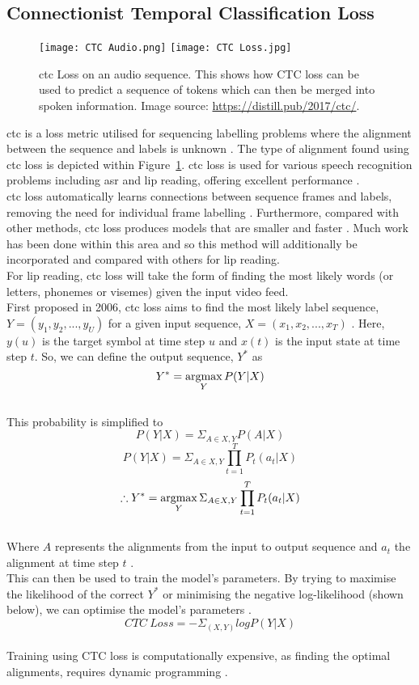\subsection{Connectionist Temporal Classification Loss}
\label{sec: CTC Loss}
\begin{figure}
\centering
\texttt{[image: CTC Audio.png]}
\texttt{[image: CTC Loss.jpg]}
\caption[\acrshort{ctc} Loss on an audio sequence.]{\acrshort{ctc} Loss on an audio sequence. This shows how CTC loss can be used to predict a sequence of tokens which can then be merged into spoken information. Image source: \url{https://distill.pub/2017/ctc/}.}
\label{fig:CTC Loss}
\end{figure}
\acrfull{ctc} \cite{original_CTC} is a loss metric utilised for sequencing labelling problems where the alignment between the sequence and labels is unknown \cite{exploration-of-CTC-acoustic-models}. The type of alignment found using \acrshort{ctc} loss is depicted within Figure~\ref{fig:CTC Loss}. \acrshort{ctc} loss is used for various speech recognition problems including \acrshort{asr} and lip reading, offering excellent performance \cite{LCANet, LipReading-with-3D-2D-CNN-and-word-CTC-models}.\\
\acrshort{ctc} loss automatically learns connections between sequence frames and labels, removing the need for individual frame labelling \cite{exploration-of-CTC-acoustic-models}. Furthermore, compared with other methods, \acrshort{ctc} loss produces models that are smaller and faster \cite{ctc_faster_models}. Much work has been done within this area and so this method will additionally be incorporated and compared with others for lip reading.\\
For lip reading, \acrshort{ctc} loss will take the form of finding the most likely words (or letters, phonemes or visemes) given the input video feed.\\
First proposed in 2006, \acrshort{ctc} loss aims to find the most likely label sequence, $Y = (y_1, y_2,..., y_U)$ for a given input sequence, $X = (x_1, x_2,...,x_T)$ \cite{original_CTC}. Here, $y(u)$ is the target symbol at time step $u$ and $x(t)$ is the input state at time step $t$. So, we can define the output sequence, $Y^*$ as
\[Y^* = \operatorname*{argmax}_Y  P(Y|X)\]\\
This probability is simplified to
\[P(Y|X) = \Sigma_{A \in X, Y} P(A|X)\]
\[P(Y|X) = \Sigma_{A \in X, Y} \prod_{t = 1}^T P_t(a_t|X)\]
\[\therefore Y^* = \operatorname*{argmax}_Y \Sigma_{A \in X, Y} \prod_{t = 1}^T P_t(a_t|X)\]\\
Where $A$ represents the alignments from the input to output sequence and $a_t$ the alignment at time step $t$ \cite{original_CTC}.\\
This can then be used to train the model's parameters. By trying to maximise the likelihood of the correct $Y^*$ or minimising the negative log-likelihood  (shown below), we can optimise the model's parameters \cite{original_CTC}.
\[CTC\ Loss = - \Sigma_{(X, Y)} log P(Y|X)\]\\
Training using CTC loss is computationally expensive, as finding the optimal alignments, requires dynamic programming \cite{original_CTC}.
